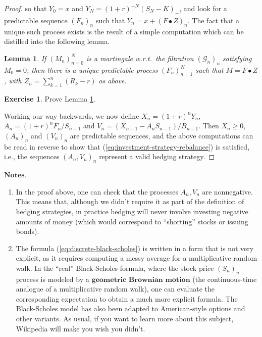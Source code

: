 \documentclass[11pt]{report}
\theoremstyle{plain}
\newtheorem{lem}[thm]{Lemma}
\theoremstyle{definition}
\newtheorem{xexercise}[thm]{Exercise}
\begin{document}
\begin{proof}
so that $Y_0 = x$ and $Y_N = (1+r)^{-N} (S_N-K)_+$, and look for a predictable sequence $(F_n)_n$ such that $Y_n = x + (F\bullet Z)_n$. The fact that a unique such process exists is the result of a simple computation which can be distilled into the following lemma.

\begin{lem}
\label{lem-easy-martingale-rep}
If $(M_n)_{n=0}^N$ is a martingale w.r.t.\ the filtration $(\mathcal{G}_n)_n$ satisfying $M_0 = 0$, then there is a unique predictable process $(F_n)_{n=1}^N$ such that $M = F\bullet Z$, with $Z_n=\sum_{k=1}^n (R_k-r)$ as above.
\end{lem}

\begin{xexercise}
Prove Lemma \ref{lem-easy-martingale-rep}.
\end{xexercise}

Working our way backwards, we now define $X_n = (1+r)^n Y_n$, $A_n = (1+r)^n F_n/S_{n-1}$ and $V_n = (X_{n-1}-A_n S_{n-1})/B_{n-1}$. Then $X_n\ge 0$, $(A_n)_n$ and $(V_n)_n$ are predictable sequences, and the above computations can be read in reverse to show that (\ref{eq:investment-strategy-rebalance}) is satisfied, i.e., the sequences $(A_n, V_n)_n$ represent a valid hedging strategy.
\end{proof}

$\textbf{Notes.}$

\begin{enumerate}[label=\arabic*.]
\item In the proof above, one can check that the processes $A_n, V_n$ are nonnegative. This means that, although we didn't require it as part of the definition of hedging strategies, in practice hedging will never involve investing negative amounts of money (which would correspond to ``shorting'' stocks or issuing bonds).
\item The formula (\ref{eq:discrete-black-scholes}) is written in a form that is not very explicit, as it requires computing a messy average for a multiplicative random walk. In the ``real'' Black-Scholes formula, where the stock price $(S_n)_n$ process is modeled by a $\textbf{geometric Brownian motion}$ (the continuous-time analogue of a multiplicative random walk), one can evaluate the corresponding expectation to obtain a much more explicit formula. The Black-Scholes model has also been adapted to American-style options and other variants. As usual, if you want to learn more about this subject, Wikipedia will make you wish you didn't.
\end{enumerate}
\end{document}
